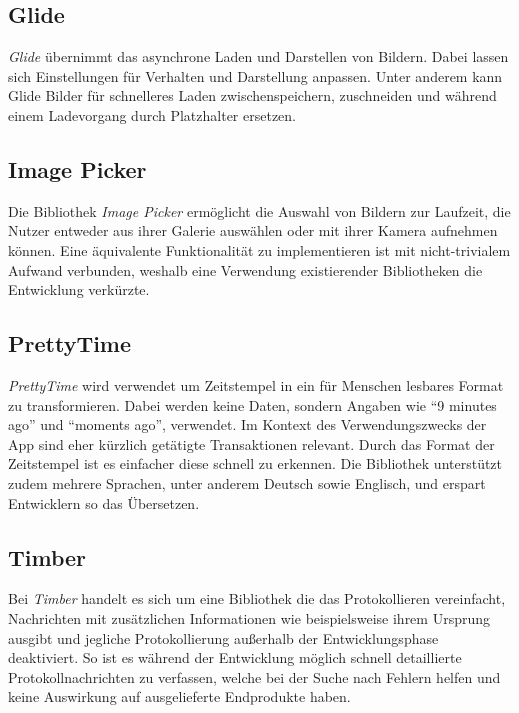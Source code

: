\subsection{Glide}
\label{subsec:app:bibs:glide}
\textit{Glide} übernimmt das asynchrone Laden und Darstellen von Bildern.
Dabei lassen sich Einstellungen für Verhalten und Darstellung anpassen.
Unter anderem kann Glide Bilder für schnelleres Laden zwischenspeichern, zuschneiden und während einem Ladevorgang durch Platzhalter ersetzen.

\subsection{Image Picker}
\label{subsec:app:bibs:imagepicker}
Die Bibliothek \textit{Image Picker} ermöglicht die Auswahl von Bildern zur Laufzeit, die Nutzer entweder aus ihrer Galerie auswählen oder mit ihrer Kamera aufnehmen können.
Eine äquivalente Funktionalität zu implementieren ist mit nicht-trivialem Aufwand verbunden, weshalb eine Verwendung existierender Bibliotheken die Entwicklung verkürzte.

\subsection{PrettyTime}
\label{subsec:app:bibs:prettytime}
\textit{PrettyTime} wird verwendet um Zeitstempel in ein für Menschen lesbares Format zu transformieren.
Dabei werden keine Daten, sondern Angaben wie "`9 minutes ago"' und "`moments ago"', verwendet.
Im Kontext des Verwendungszwecks der App sind eher kürzlich getätigte Transaktionen relevant.
Durch das Format der Zeitstempel ist es einfacher diese schnell zu erkennen.
Die Bibliothek unterstützt zudem mehrere Sprachen, unter anderem Deutsch sowie Englisch, und erspart Entwicklern so das Übersetzen.

\subsection{Timber}
\label{subsec:app:bibs:timber}
Bei \textit{Timber} handelt es sich um eine Bibliothek die das Protokollieren vereinfacht, Nachrichten mit zusätzlichen Informationen wie beispielsweise ihrem Ursprung ausgibt und jegliche Protokollierung außerhalb der Entwicklungsphase deaktiviert.
So ist es während der Entwicklung möglich schnell detaillierte Protokollnachrichten zu verfassen, welche bei der Suche nach Fehlern helfen und keine Auswirkung auf ausgelieferte Endprodukte haben.

